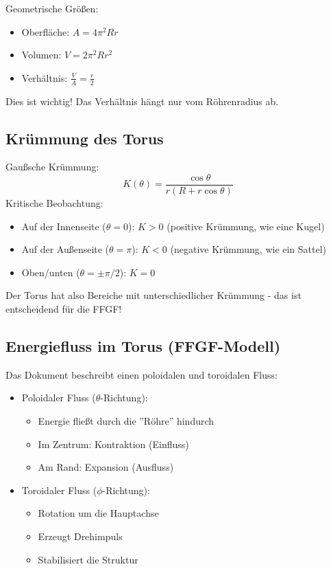 	Geometrische Größen:
	\begin{itemize}
		\item Oberfläche: \( A = 4\pi^2 R r \)
		\item Volumen: \( V = 2\pi^2 R r^2 \)
		\item Verhältnis: \( \frac{V}{A} = \frac{r}{2} \)
	\end{itemize}
	Dies ist wichtig! Das Verhältnis hängt nur vom Röhrenradius ab.
	
	\subsection{Krümmung des Torus}
	Gaußsche Krümmung:
	\[
	K(\theta) = \frac{\cos \theta}{r(R + r \cos \theta)}
	\]
	Kritische Beobachtung:
	\begin{itemize}
		\item Auf der Innenseite (\( \theta = 0 \)): \( K > 0 \) (positive Krümmung, wie eine Kugel)
		\item Auf der Außenseite (\( \theta = \pi \)): \( K < 0 \) (negative Krümmung, wie ein Sattel)
		\item Oben/unten (\( \theta = \pm\pi/2 \)): \( K = 0 \)
	\end{itemize}
	Der Torus hat also Bereiche mit unterschiedlicher Krümmung - das ist entscheidend für die FFGF!
	
	\subsection{Energiefluss im Torus (FFGF-Modell)}
	Das Dokument beschreibt einen poloidalen und toroidalen Fluss:
	\begin{itemize}
		\item Poloidaler Fluss (\( \theta \)-Richtung):
		\begin{itemize}
			\item Energie fließt durch die ''Röhre'' hindurch
			\item Im Zentrum: Kontraktion (Einfluss)
			\item Am Rand: Expansion (Ausfluss)
		\end{itemize}
		\item Toroidaler Fluss (\( \phi \)-Richtung):
		\begin{itemize}
			\item Rotation um die Hauptachse
			\item Erzeugt Drehimpuls
			\item Stabilisiert die Struktur
		\end{itemize}
	\end{itemize}
	
